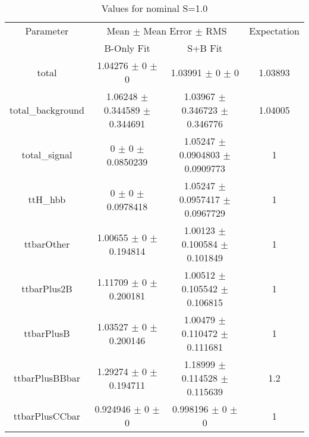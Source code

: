 \begin{table}
\centering
\caption{Values for nominal S=1.0}
\begin{tabular}{cccc}
\toprule
Parameter & \multicolumn{2}{c}{Mean $\pm$ Mean Error $\pm$ RMS} & Expectation\\
 & B-Only Fit & S+B Fit & \\
\midrule
total & \num{1.04276} $\pm$ \num{0} $\pm$ \num{0} & \num{1.03991} $\pm$ \num{0} $\pm$ \num{0} & \num{1.03893}\\
total\_background & \num{1.06248} $\pm$ \num{0.344589} $\pm$ \num{0.344691} & \num{1.03967} $\pm$ \num{0.346723} $\pm$ \num{0.346776} & \num{1.04005}\\
total\_signal & \num{0} $\pm$ \num{0} $\pm$ \num{0.0850239} & \num{1.05247} $\pm$ \num{0.0904803} $\pm$ \num{0.0909773} & \num{1}\\
ttH\_hbb & \num{0} $\pm$ \num{0} $\pm$ \num{0.0978418} & \num{1.05247} $\pm$ \num{0.0957417} $\pm$ \num{0.0967729} & \num{1}\\
ttbarOther & \num{1.00655} $\pm$ \num{0} $\pm$ \num{0.194814} & \num{1.00123} $\pm$ \num{0.100584} $\pm$ \num{0.101849} & \num{1}\\
ttbarPlus2B & \num{1.11709} $\pm$ \num{0} $\pm$ \num{0.200181} & \num{1.00512} $\pm$ \num{0.105542} $\pm$ \num{0.106815} & \num{1}\\
ttbarPlusB & \num{1.03527} $\pm$ \num{0} $\pm$ \num{0.200146} & \num{1.00479} $\pm$ \num{0.110472} $\pm$ \num{0.111681} & \num{1}\\
ttbarPlusBBbar & \num{1.29274} $\pm$ \num{0} $\pm$ \num{0.194711} & \num{1.18999} $\pm$ \num{0.114528} $\pm$ \num{0.115639} & \num{1.2}\\
ttbarPlusCCbar & \num{0.924946} $\pm$ \num{0} $\pm$ \num{0} & \num{0.998196} $\pm$ \num{0} $\pm$ \num{0} & \num{1}\\
\bottomrule
\end{tabular}
\end{table}